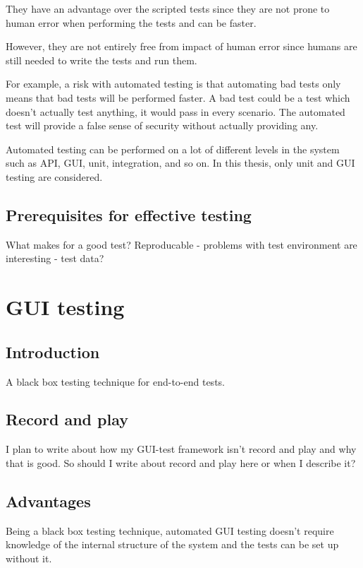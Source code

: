 \documentclass{article}
\begin{document}
			They have an advantage over the scripted tests since they are not prone to human error when performing the tests and can be faster. 

			However, they are not entirely free from impact of human error since humans are still needed to write the tests and run them. \cite{snakeoil} 

			For example, a risk with automated testing is that automating bad tests only means that bad tests will be performed faster. A bad test could be a test which doesn't actually test anything, it would pass in every scenario. The automated test will provide a false sense of security without actually providing any.  \cite{lessons}

			Automated testing can be performed on a lot of different levels in the system such as API, GUI, unit, integration, and so on. In this thesis, only unit and GUI testing are considered.

			\subsection{Prerequisites for effective testing}

			What makes for a good test? Reproducable - problems with test environment are interesting - test data?

	\section{GUI testing}
		\subsection{Introduction}
		A black box testing technique for end-to-end tests. 

		\subsection{Record and play}
		I plan to write about how my GUI-test framework isn't record and play and why that is good. So should I write about record and play here or when I describe it?

		\subsection{Advantages}
		Being a black box testing technique, automated GUI testing doesn't require knowledge of the internal structure of the system and the tests can be set up without it.
\end{document}
